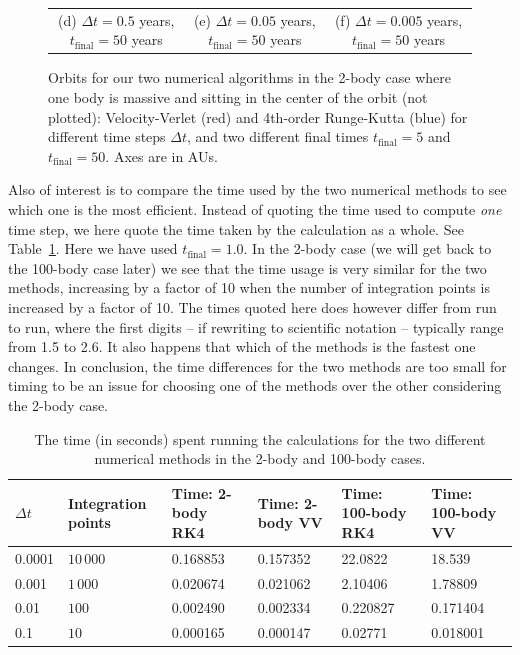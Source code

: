 \documentclass{article}
\begin{document}
\begin{multicols}{2}
\begin{figure}
\begin{center}
\begin{tabular}{ccc}
	(d) $\Delta t = 0.5$ years, $t_{\mathrm{final}} = 50$ years				&(e) $\Delta t = 0.05$ years, $t_{\mathrm{final}} = 50$ years 	& (f) $\Delta t = 0.005$ years, $t_{\mathrm{final}} = 50$ years  \\[6pt]
\end{tabular}
\caption{Orbits for our two numerical algorithms in the 2-body case where one body is massive and sitting in the center of the orbit (not plotted): Velocity-Verlet (red) and 4th-order Runge-Kutta (blue) for different time steps $\Delta t$, and two different final times $t_{\mathrm{final}} = 5$ and $t_{\mathrm{final}} = 50$. Axes are in AUs.}\label{fig:2_body}
\end{center}
\end{figure}
Also of interest is to compare the time used by the two numerical methods to see which one is the most efficient. Instead of quoting the time used to compute \textit{one} time step, we here quote the time taken by the calculation as a whole. See Table~\ref{table:times}. Here we have used $t_{\mathrm{final}} = 1.0$. In the 2-body case (we will get back to the 100-body case later) we see that the time usage is very similar for the two methods, increasing by a factor of 10 when the number of integration points is increased by a factor of 10. The times quoted here does however differ from run to run, where the first digits -- if rewriting to scientific notation -- typically range from 1.5 to 2.6. It also happens that which of the methods is the fastest one changes. In conclusion, the time differences for the two methods are too small for timing to be an issue for choosing one of the methods over the other considering the 2-body case.

\begin{table}
\begin{center}
\begin{tabular}{ l l l l l l}\hline
	$\Delta t$ 				& Integration points	 	& Time: 2-body RK4			& Time: 2-body VV			& Time: 100-body RK4 		& Time: 100-body VV	\\ \hline
	0.0001 				& $10\,000$ 			& 0.168853				& 0.157352				& 22.0822					& 18.539		 \\
	0.001 				& $1\,000$ 			& 0.020674				& 0.021062				& 2.10406					& 1.78809		 \\
	0.01 					& $100$ 				& 0.002490				& 0.002334				& 0.220827				& 0.171404	 \\
	0.1 					& $10$				& 0.000165				& 0.000147				& 0.02771					& 0.018001		 \\
	\hline
\end{tabular}
\caption{The time (in seconds) spent running the calculations for the two different numerical methods in the 2-body and 100-body cases.}\label{table:times}
\end{center}
\end{table}


\end{multicols}
\end{document}
